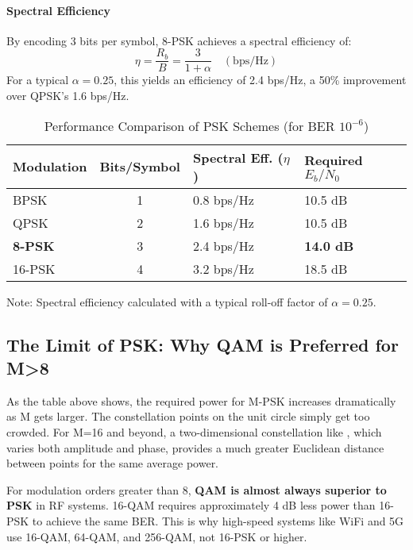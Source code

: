 \paragraph{Spectral Efficiency}
By encoding 3 bits per symbol, 8-PSK achieves a spectral efficiency of:
\begin{equation}
    \eta = \frac{R_b}{B} = \frac{3}{1+\alpha} \quad (\text{bps/Hz})
\end{equation}
For a typical $\alpha=0.25$, this yields an efficiency of 2.4 bps/Hz, a 50\% improvement over QPSK's 1.6 bps/Hz.

\begin{table}[H]
    \centering
    \caption{Performance Comparison of PSK Schemes (for BER $10^{-6}$)}
    \label{tab:psk-comparison}
    \begin{tabularx}{\textwidth}{@{}lcXX@{}}
        \toprule
        \tableheaderfont Modulation & \tableheaderfont Bits/Symbol & \tableheaderfont Spectral Eff. ($\eta$) & \tableheaderfont Required $E_b/N_0$ \\
        \midrule
        BPSK & 1 & 0.8 bps/Hz & 10.5 dB \\
        QPSK & 2 & 1.6 bps/Hz & 10.5 dB \\
        \textbf{8-PSK} & 3 & 2.4 bps/Hz & \textbf{14.0 dB} \\
        16-PSK & 4 & 3.2 bps/Hz & 18.5 dB \\
        \bottomrule
    \end{tabularx}
    \par\vspace{0.5em}
    \small Note: Spectral efficiency calculated with a typical roll-off factor of $\alpha=0.25$.
\end{table}


\subsection{The Limit of PSK: Why QAM is Preferred for M>8}

As the table above shows, the required power for M-PSK increases dramatically as M gets larger. The constellation points on the unit circle simply get too crowded. For M=16 and beyond, a two-dimensional constellation like , which varies both amplitude and phase, provides a much greater Euclidean distance between points for the same average power.
\begin{warningbox}
    For modulation orders greater than 8, \textbf{QAM is almost always superior to PSK} in RF systems. 16-QAM requires approximately 4 dB less power than 16-PSK to achieve the same BER. This is why high-speed systems like WiFi and 5G use 16-QAM, 64-QAM, and 256-QAM, not 16-PSK or higher.
\end{warningbox}


